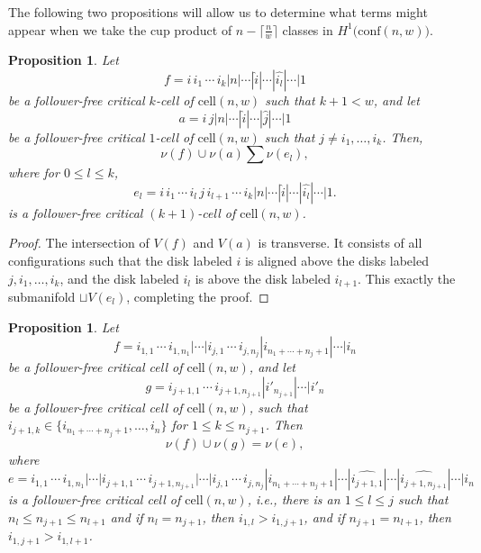 \documentclass[pagebackref,colorlinks,citecolor=blue,linkcolor=blue,urlcolor=blue,filecolor=blue]{article}
\newtheorem{prop}[thm]{Proposition}
\theoremstyle{definition}\newtheorem{definition}[thm]{Definition}
\theoremstyle{definition}
\begin{document}
The following two propositions will allow us to determine what terms might appear when we take the cup product of $n-\big\lceil\frac{n}{w}\big\rceil$ classes in $H^{1}\big(\text{conf}(n,w)\big)$.

\begin{prop}\label{product of critical cells with same first element is a sum of critical cells with the same first element}
Let
\[
f=i\, i_{1}\, \cdots\, i_{k}|n|\cdots|\widehat{i}|\cdots|\widehat{i_{l}}|\cdots|1
\]
be a follower-free critical $k$-cell of $\text{cell}(n,w)$ such that $k+1<w$, and let
\[
a=i\, j|n|\cdots|\widehat{i}|\cdots|\widehat{j}|\cdots|1
\]
be a follower-free critical $1$-cell of $\text{cell}(n,w)$ such that $j\neq i_{1},\dots, i_{k}$.
Then,
\[
\nu(f)\cup\nu(a)\sum\nu(e_{l}),
\]
where for $0\le l\le k$,
\[
e_{l}=i\, i_{1}\, \cdots\,i_{l}\, j\, i_{l+1}\, \cdots\,  i_{k}|n|\cdots|\widehat{i}|\cdots|\widehat{i_{l}}|\cdots|1.
\]
is a follower-free critical $(k+1)$-cell of $\text{cell}(n,w)$.
\end{prop}

\begin{proof}
The intersection of $V(f)$ and $V(a)$ is transverse.
It consists of all configurations such that the disk labeled $i$ is aligned above the disks labeled $j, i_{1},\dots, i_{k}$, and the disk labeled $i_{l}$ is above the disk labeled $i_{l+1}$. 
This exactly the submanifold $\sqcup V(e_{l})$, completing the proof.
\end{proof}

\begin{prop}\label{product of disjoint critical cells}
Let
\[
f=i_{1,1}\, \cdots\, i_{1, n_{1}}|\cdots|i_{j, 1}\, \cdots\, i_{j, n_{j}}|i_{n_{1}+\cdots+n_{j}+1}|\cdots|i_{n}
\]
be a follower-free critical cell of $\text{cell}(n,w)$,
and let
\[
g=i_{j+1, 1}\, \cdots\, i_{j+1, n_{j+1}}|i'_{n_{j+1}}|\cdots|i'_{n}
\]
be a follower-free critical cell of $\text{cell}(n,w)$, such that $i_{j+1, k}\in \{i_{n_{1}+\cdots+n_{j}+1},\dots,i_{n}\}$ for $1\le k\le n_{j+1}$.
Then
\[
\nu(f)\cup \nu(g)=\nu(e),
\]
where
\[
e=i_{1,1}\, \cdots\, i_{1, n_{1}}|\cdots|i_{j+1, 1}\, \cdots\, i_{j+1, n_{j+1}}|\cdots|i_{j, 1}\, \cdots\, i_{j, n_{j}}|i_{n_{1}+\cdots+n_{j}+1}|\cdots|\widehat{i_{j+1, 1}}|\cdots|\widehat{i_{j+1, n_{j+1}}}|\cdots|i_{n}
\]
is a follower-free critical cell of $\text{cell}(n,w)$, i.e., there is an $1\le l\le j$ such that $n_{l}\le n_{j+1}\le n_{l+1}$ and if $n_{l}=n_{j+1}$, then $i_{1, l}>i_{1,j+1}$, and if $n_{j+1}=n_{l+1}$, then $i_{1, j+1}>i_{1,l+1}$.
\end{prop}
\end{document}
